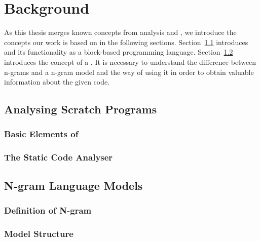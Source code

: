 \chapter{Background}\label{chap:background}
As this thesis merges known concepts from \scratch{} analysis and \ngram{}, we introduce the concepts our work is based on in the following sections. Section~\ref{sec:analysing-scratch} introduces \scratch{} and its functionality as a block-based programming language. Section~\ref{sec:language-models} introduces the concept of a \ngram{}. It is necessary to understand the difference between n-grams and a n-gram model and the way of using it in order to obtain valuable information about the given code.


\section{Analysing Scratch Programs}\label{sec:analysing-scratch}

\subsection{Basic Elements of \scratch}\label{subsec:scratch}

\subsection{The Static \scratch{} Code Analyser \litterbox}\label{subsec:litterbox}


\section{N-gram Language Models}\label{sec:language-models}

\subsection{Definition of N-gram}\label{subsec:ngram}

\subsection{Model Structure}\label{subsec:ngram}


